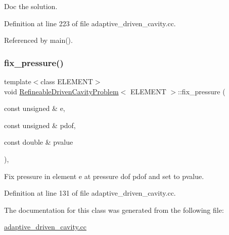 Doc the solution. 



Definition at line 223 of file adaptive\+\_\+driven\+\_\+cavity.\+cc.



Referenced by main().

\mbox{\label{classRefineableDrivenCavityProblem_adaf562f21e050496c5390e10bdb39889}} 
\subsubsection{\texorpdfstring{fix\+\_\+pressure()}{fix\_pressure()}}
{\footnotesize\ttfamily template$<$class E\+L\+E\+M\+E\+NT$>$ \\
void \hyperlink{classRefineableDrivenCavityProblem}{Refineable\+Driven\+Cavity\+Problem}$<$ E\+L\+E\+M\+E\+NT $>$\+::fix\+\_\+pressure (\begin{DoxyParamCaption}\item[{const unsigned \&}]{e,  }\item[{const unsigned \&}]{pdof,  }\item[{const double \&}]{pvalue }\end{DoxyParamCaption})\hspace{0.3cm}{\ttfamily [inline]}, {\ttfamily [private]}}



Fix pressure in element e at pressure dof pdof and set to pvalue. 



Definition at line 131 of file adaptive\+\_\+driven\+\_\+cavity.\+cc.



The documentation for this class was generated from the following file\+:\begin{DoxyCompactItemize}
\item 
\hyperlink{adaptive__driven__cavity_8cc}{adaptive\+\_\+driven\+\_\+cavity.\+cc}\end{DoxyCompactItemize}
